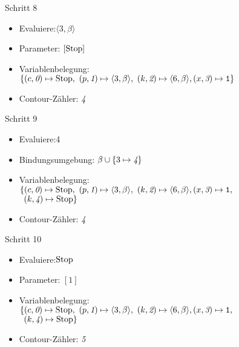 \documentclass{beamer}
\begin{document}
\begin{frame}
\begin{overprint}
\onslide<+>
\begin{block}{Schritt 8}
\begin{itemize}
\item Evaluiere:\phantom{$\langle$}$\langle 3, \beta\rangle$
\item Parameter: $[\text{Stop}]$
\item Variablenbelegung: \\
$\{ (c,\textit 0) \mapsto \text{Stop},\ (p,\textit 1) \mapsto \langle 3 ,\beta\rangle,\ (k,\textit 2) \mapsto \langle6, \beta\rangle, (x,\textit 3) \mapsto \text{\tt 1}\}$
\item Contour-Zähler: \textit4
\end{itemize}
\end{block}

\onslide<+>
\begin{block}{Schritt 9}
\begin{itemize}
\item Evaluiere:\phantom{$\langle$}4
\item Bindungsumgebung: $\beta \cup \{ 3 \mapsto \textit 4 \}$
\item Variablenbelegung: \\
$\{ (c,\textit 0) \mapsto \text{Stop},\ (p,\textit 1) \mapsto \langle 3 ,\beta\rangle,\ (k,\textit 2) \mapsto \langle6, \beta\rangle, (x,\textit 3) \mapsto \text{\tt 1},$\\$\phantom{\{}(k,\textit 4) \mapsto \Stop\}$
\item Contour-Zähler: \textit4
\end{itemize}
\end{block}

\onslide<+>
\begin{block}{Schritt 10}
\begin{itemize}
\item Evaluiere:\phantom{$\langle$}$\text{Stop}$
\item Parameter: $[1]$
\item Variablenbelegung: \\
$\{ (c,\textit 0) \mapsto \text{Stop},\ (p,\textit 1) \mapsto \langle 3 ,\beta\rangle,\ (k,\textit 2) \mapsto \langle6, \beta\rangle, (x,\textit 3) \mapsto \text{\tt 1},$\\$\phantom{\{}(k,\textit 4) \mapsto \Stop\}$
\item Contour-Zähler: \textit5
\end{itemize}
\end{block}

\end{overprint}

\end{frame}
\end{document}
